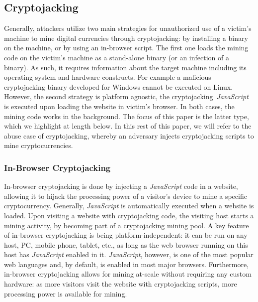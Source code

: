 \documentclass[acmlarge]{acmart}
\newcommand{\vs}[1]{{\vspace{-#1mm}}}
\newcommand{\js}{{\em JavaScript}\xspace}
\newcommand{\cc}{{cryptocurrency}\xspace}
\newcommand{\cj}{cryptojacking\xspace}
\begin{document}
\subsection{Cryptojacking}\label{sec:cj} 
Generally, attackers utilize two main strategies for unauthorized use of a victim's machine to mine digital currencies through \cj:  by installing a binary on the  machine, or by using an in-browser script. The first one loads the mining code on the victim's machine as a stand-alone binary (or an infection of a binary). As such, it requires information about the target machine including its operating system and hardware constructs. For example a malicious \cj binary developed for Windows cannot be executed on Linux. However, the second strategy is platform agnostic, the \cj~\js is executed upon loading the website in victim's browser. In both cases, the mining code works in the background. The focus of this paper is the latter type, which we highlight at length below. In this rest of this paper, we will refer to the abuse case of \cj, whereby an adversary injects \cj scripts to mine cryptocurrencies.%

\vs{0}
\subsubsection{In-Browser Cryptojacking} \label{sec:brcj}
In-browser \cj is done by injecting a \js code in a website, allowing it to hijack the processing power of a visitor's device to mine a specific \cc. Generally, \js is automatically executed when a website is loaded. Upon visiting a website with \cj code, the visiting host starts a mining activity, by becoming part of a \cj mining pool.  A key feature of in-browser \cj is being platform-independent: it can be run on any host, PC, mobile phone, tablet, etc., as long as the web browser running on this host has \js enabled in it. \js, however, is one of the most popular web languages and, by default, is enabled in most major browsers. Furthermore, in-browser \cj allows for mining at-scale without requiring any custom hardware: as more visitors visit the website with \cj scripts, more processing power is available for mining. 

\vs{0}
\end{document}
